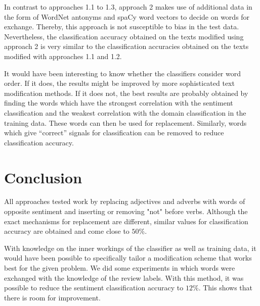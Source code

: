 \documentclass[11pt,a4paper]{article}
\begin{document}
In contrast to approaches 1.1 to 1.3, approach 2 makes use of additional data in the form of WordNet antonyms and spaCy word vectors to decide on words for exchange. Thereby, this approach is not susceptible to bias in the test data. Nevertheless, the classification accuracy obtained on the texts modified using approach 2 is very similar to the classification accuracies obtained on the texts modified with approaches 1.1 and 1.2. 

It would have been interesting to know whether the classifiers consider word order. If it does, the results might be improved by more sophisticated text modification methods. If it does not, the best results are probably obtained by finding the words which have the strongest correlation with the sentiment classification and the weakest correlation with the domain classification in the training data. These words can then be used for replacement. Similarly, words which give ``correct'' signals for classification can be removed to reduce classification accuracy.

\section{Conclusion}
All approaches tested work by replacing adjectives and adverbs with words of opposite sentiment and inserting or removing "not" before verbs. Although the exact mechanisms for replacement are different,  similar values for classification accuracy are obtained and come close to $50$\%.

With knowledge on the inner workings of the classifier as well as training data, it would have been possible to specifically tailor a modification scheme that works best for the given problem. We did some experiments in which words were exchanged with the knowledge of the review labels. With this method, it was possible to reduce the sentiment classification accuracy to $12$\%. This shows that there is room for improvement.



\end{document}
